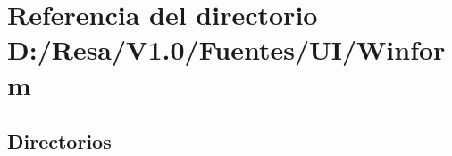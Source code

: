 \section{Referencia del directorio D\+:/\+Resa/\+V1.0/\+Fuentes/\+U\+I/\+Winform}
\label{dir_1d294a5bdaaeab7eeed1e1b2ed6f194a}
\subsection*{Directorios}
\begin{DoxyCompactItemize}
\end{DoxyCompactItemize}
